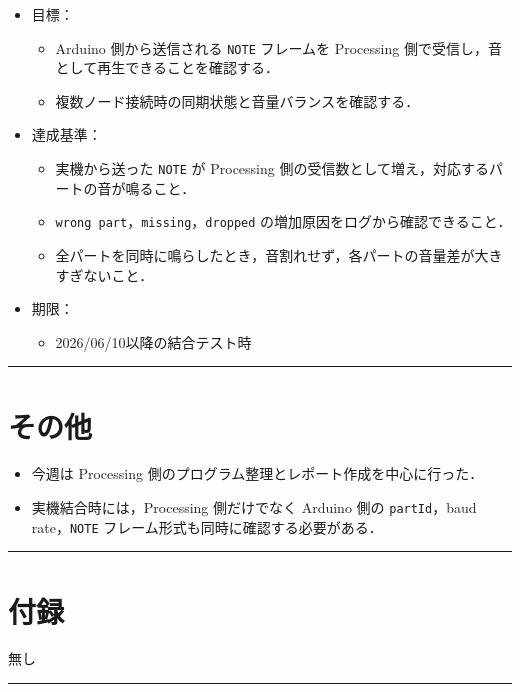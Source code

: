 \documentclass[uplatex,dvipdfmx,a4paper,11pt]{jsarticle}
\newcommand{\sectionrule}{\par\medskip\noindent\rule{\linewidth}{0.6pt}\par\medskip}
\begin{document}
\begin{itemize}
  \item 目標：
    \begin{itemize}
      \item Arduino 側から送信される \texttt{NOTE} フレームを Processing 側で受信し，音として再生できることを確認する．
      \item 複数ノード接続時の同期状態と音量バランスを確認する．
    \end{itemize}
  \item 達成基準：
    \begin{itemize}
      \item 実機から送った \texttt{NOTE} が Processing 側の受信数として増え，対応するパートの音が鳴ること．
      \item \texttt{wrong part}，\texttt{missing}，\texttt{dropped} の増加原因をログから確認できること．
      \item 全パートを同時に鳴らしたとき，音割れせず，各パートの音量差が大きすぎないこと．
    \end{itemize}
  \item 期限：
    \begin{itemize}
      \item 2026/06/10以降の結合テスト時
    \end{itemize}
\end{itemize}

\sectionrule

\section{その他}

\begin{itemize}
  \item 今週は Processing 側のプログラム整理とレポート作成を中心に行った．
  \item 実機結合時には，Processing 側だけでなく Arduino 側の \texttt{partId}，baud rate，\texttt{NOTE} フレーム形式も同時に確認する必要がある．
\end{itemize}

\sectionrule

\section{付録}

無し

\sectionrule
\end{document}
